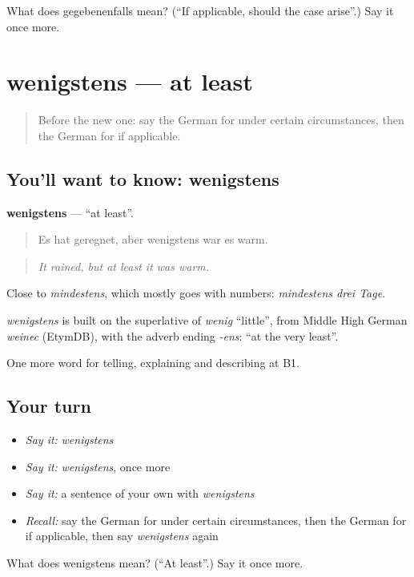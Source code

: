 \begin{tcolorbox}[breakable,colback=teal!4,colframe=teal!35!black,title={Before you move on}]
What does gegebenenfalls mean? (\textquotedblleft{}If applicable, should the case arise\textquotedblright{}.) Say it once more.
\end{tcolorbox}
\section[wenigstens]{wenigstens — at least}

\label{lesson:GE-C366-wenigstens}



\begin{quote}
Before the new one: say the German for under certain circumstances, then the German for if applicable.
\end{quote}

\subsection*{You'll want to know: wenigstens}
\textbf{wenigstens} — \textquotedblleft{}at least\textquotedblright{}.

\begin{quote}
Es hat geregnet, aber wenigstens war es warm.
\end{quote}

\begin{quote}
\emph{It rained, but at least it was warm.}
\end{quote}

Close to \emph{mindestens}, which mostly goes with numbers: \emph{mindestens drei Tage}.

\begin{cousinweb}
\emph{wenigstens} is built on the superlative of \emph{wenig} \textquotedblleft{}little\textquotedblright{}, from Middle High German \emph{weinec} (EtymDB), with the adverb ending \emph{-ens}: \textquotedblleft{}at the very least\textquotedblright{}.
\end{cousinweb}

\begin{grammarlens}[title={What you've built}]
One more word for telling, explaining and describing at B1.
\end{grammarlens}

\subsection*{Your turn}
\begin{itemize}
\raggedright
  \item \emph{Say it:} \emph{wenigstens}
  \item \emph{Say it:} \emph{wenigstens}, once more
  \item \emph{Say it:} a sentence of your own with \emph{wenigstens}
  \item \emph{Recall:} say the German for under certain circumstances, then the German for if applicable, then say \emph{wenigstens} again
\end{itemize}

\begin{tcolorbox}[breakable,colback=teal!4,colframe=teal!35!black,title={Before you move on}]
What does wenigstens mean? (\textquotedblleft{}At least\textquotedblright{}.) Say it once more.
\end{tcolorbox}
